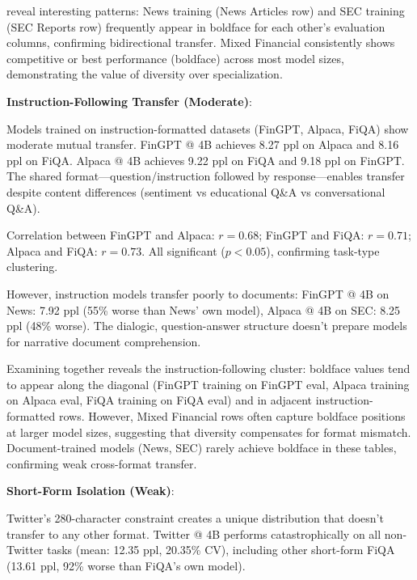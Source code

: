 



 reveal interesting patterns: News training (News Articles row) and SEC training (SEC Reports row) frequently appear in boldface for each other's evaluation columns, confirming bidirectional transfer. Mixed Financial consistently shows competitive or best performance (boldface) across most model sizes, demonstrating the value of diversity over specialization.

\textbf{Instruction-Following Transfer (Moderate)}:

Models trained on instruction-formatted datasets (FinGPT, Alpaca, FiQA) show moderate mutual transfer. FinGPT @ 4B achieves 8.27 ppl on Alpaca and 8.16 ppl on FiQA. Alpaca @ 4B achieves 9.22 ppl on FiQA and 9.18 ppl on FinGPT. The shared format—question/instruction followed by response—enables transfer despite content differences (sentiment vs educational Q\&A vs conversational Q\&A).

Correlation between FinGPT and Alpaca: $r = 0.68$; FinGPT and FiQA: $r = 0.71$; Alpaca and FiQA: $r = 0.73$. All significant ($p < 0.05$), confirming task-type clustering.

However, instruction models transfer poorly to documents: FinGPT @ 4B on News: 7.92 ppl (55\% worse than News' own model), Alpaca @ 4B on SEC: 8.25 ppl (48\% worse). The dialogic, question-answer structure doesn't prepare models for narrative document comprehension.







Examining  together reveals the instruction-following cluster: boldface values tend to appear along the diagonal (FinGPT training on FinGPT eval, Alpaca training on Alpaca eval, FiQA training on FiQA eval) and in adjacent instruction-formatted rows. However, Mixed Financial rows often capture boldface positions at larger model sizes, suggesting that diversity compensates for format mismatch. Document-trained models (News, SEC) rarely achieve boldface in these tables, confirming weak cross-format transfer.

\textbf{Short-Form Isolation (Weak)}:

Twitter's 280-character constraint creates a unique distribution that doesn't transfer to any other format. Twitter @ 4B performs catastrophically on all non-Twitter tasks (mean: 12.35 ppl, 20.35\% CV), including other short-form FiQA (13.61 ppl, 92\% worse than FiQA's own model).


